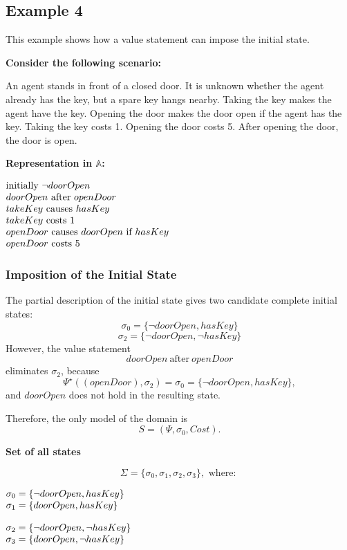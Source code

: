 \documentclass[11pt]{article}
\makeatletter
\newcommand{\states}{\Sigma}
\newcommand{\scenarioheader}{\par\noindent\textbf{Consider the following scenario:}\par}
\newcommand{\repheader}{\par\noindent\textbf{Representation in \(\mathbb{A}\):}\par}
\newcommand{\exampleblocktitle}[1]{\par\medskip\noindent\textbf{#1}\par\smallskip}
\newenvironment{centeredleftblock}[1][0.78\textwidth]
{\begin{center}\begin{minipage}{#1}\raggedright}
{\end{minipage}\end{center}}
\newenvironment{statementblock}
{\begin{flushleft}\renewcommand{\arraystretch}{1.1}\(\begin{array}{@{}l@{}}}
{\end{array}\)\end{flushleft}}
\makeatother
\begin{document}
\subsection*{Example 4}
This example shows how a value statement can impose the initial state.

\scenarioheader
An agent stands in front of a closed door. It is unknown whether the agent
already has the key, but a spare key hangs nearby. Taking the key makes the
agent have the key. Opening the door makes the door open if the agent has the
key. Taking the key costs 1. Opening the door costs 5. After 
opening the door, the door is open.


\repheader
\begin{centeredleftblock}[0.62\textwidth]
\begin{statementblock}
\text{initially}~ \neg doorOpen \\
doorOpen ~\text{after}~ openDoor \\
takeKey ~\text{causes}~ hasKey \\
takeKey ~\text{costs}~ 1 \\
openDoor ~\text{causes}~ doorOpen ~\text{if}~ hasKey \\
openDoor ~\text{costs}~ 5
\end{statementblock}
\end{centeredleftblock}

\subsubsection*{Imposition of the Initial State}
The partial description of the initial state gives two candidate complete
initial states:
\[
\sigma_0 = \{\neg doorOpen, hasKey\}
\]
\[
\sigma_2 = \{\neg doorOpen, \neg hasKey\}
\]
However, the value statement
\[
doorOpen ~\text{after}~ openDoor
\]
eliminates \(\sigma_2\), because
\[
\Psi^\star((openDoor), \sigma_2) = \sigma_0 = \{\neg doorOpen, hasKey\},
\]
and \(doorOpen\) does not hold in the resulting state.

Therefore, the only model of the domain is
\[
S = (\Psi, \sigma_0, Cost).
\]

\exampleblocktitle{Set of all states}
\[
\states = \{\sigma_0, \sigma_1, \sigma_2, \sigma_3\},\text{ where: }
\]
\noindent
\begin{minipage}[t]{0.47\textwidth}
\begin{statementblock}
\sigma_0 = \{\neg doorOpen, hasKey\} \\
\sigma_1 = \{doorOpen, hasKey\}
\end{statementblock}
\end{minipage}
\hfill
\begin{minipage}[t]{0.47\textwidth}
\begin{statementblock}
\sigma_2 = \{\neg doorOpen, \neg hasKey\} \\
\sigma_3 = \{doorOpen, \neg hasKey\}
\end{statementblock}
\end{minipage}
\end{document}
